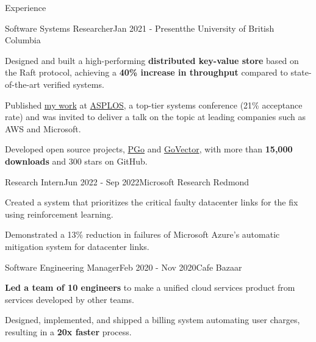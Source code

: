 \documentclass[
	10pt, %
]{resume} %
\begin{document}
\begin{rSection}{Experience}

  \begin{rSubsection}{Software Systems Researcher}{Jan 2021 -
    Present}{\textnormal{the} University of British Columbia}{}

    \item Designed and built a high-performing \textbf{distributed key-value store} based
      on the Raft protocol, achieving a \textbf{40\% increase in throughput} compared to 
      state-of-the-art verified systems.

    \item Published \href{https://dl.acm.org/doi/10.1145/3575693.3575695}{my work} 
      at \href{https://asplos-conference.org/}{ASPLOS}, a top-tier systems
      conference (21\% acceptance rate) and was
      invited to deliver a talk on the topic at leading companies such as AWS and
      Microsoft.

    \item Developed open source projects, \href{https://github.com/DistCompiler/pgo}{PGo} 
      and \href{https://github.com/DistributedClocks/GoVector}{GoVector}, with
      more than \textbf{15,000 downloads} and 300 stars on GitHub.

	\end{rSubsection}

  \begin{rSubsection}{Research Intern}{Jun 2022 - Sep 2022}{Microsoft Research Redmond}{}

    \item Created a system that prioritizes the critical faulty datacenter links
      for the fix using reinforcement learning.

    \item Demonstrated a 13\% reduction in failures of Microsoft Azure's automatic
    mitigation system for datacenter links. 

	\end{rSubsection}

  \begin{rSubsection}{Software Engineering Manager}{Feb 2020 - Nov 2020}{Cafe Bazaar}{}

    \item \textbf{Led a team of 10 engineers} to make a uniﬁed cloud services product
      from services developed by other teams.

    \item Designed, implemented, and shipped a billing system automating user
      charges, resulting in a \textbf{20x faster} process.


\end{rSubsection}
\end{rSection}
\end{document}
